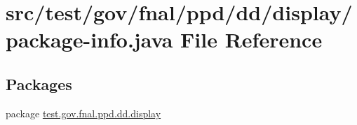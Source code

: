 \hypertarget{test_2gov_2fnal_2ppd_2dd_2display_2package-info_8java}{\section{src/test/gov/fnal/ppd/dd/display/package-\/info.java File Reference}
\label{test_2gov_2fnal_2ppd_2dd_2display_2package-info_8java}
}
\subsection*{Packages}
\begin{DoxyCompactItemize}
\item 
package \hyperlink{namespacetest_1_1gov_1_1fnal_1_1ppd_1_1dd_1_1display}{test.\-gov.\-fnal.\-ppd.\-dd.\-display}
\end{DoxyCompactItemize}
